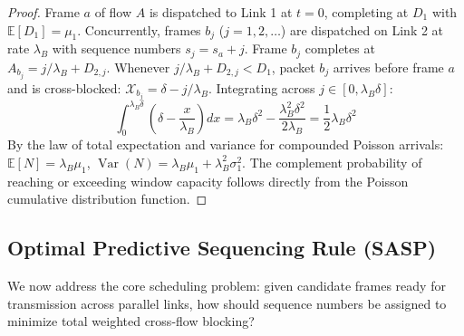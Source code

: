 \documentclass[10pt,journal,compsoc]{IEEEtran}
\begin{document}
\begin{proof}
Frame $a$ of flow $A$ is dispatched to Link 1 at $t=0$, completing at $D_1$ with $\mathbb{E}[D_1] = \mu_1$. Concurrently, frames $b_j$ ($j = 1, 2, \dots$) are dispatched on Link 2 at rate $\lambda_B$ with sequence numbers $s_j = s_a + j$. Frame $b_j$ completes at $A_{b_j} = j / \lambda_B + D_{2, j}$. Whenever $j / \lambda_B + D_{2, j} < D_1$, packet $b_j$ arrives before frame $a$ and is cross-blocked: $\mathcal{X}_{b_j} = \delta - j / \lambda_B$. Integrating across $j \in [0, \lambda_B \delta]$:
\begin{equation}
    \int_0^{\lambda_B \delta} \left(\delta - \frac{x}{\lambda_B}\right) dx = \lambda_B \delta^2 - \frac{\lambda_B^2 \delta^2}{2\lambda_B} = \frac{1}{2} \lambda_B \delta^2
\end{equation}
By the law of total expectation and variance for compounded Poisson arrivals: $\mathbb{E}[N] = \lambda_B \mu_1$, $\operatorname{Var}(N) = \lambda_B \mu_1 + \lambda_B^2 \sigma_1^2$. The complement probability of reaching or exceeding window capacity follows directly from the Poisson cumulative distribution function.
\end{proof}

\subsection{Optimal Predictive Sequencing Rule (SASP)}

We now address the core scheduling problem: given candidate frames ready for transmission across parallel links, how should sequence numbers be assigned to minimize total weighted cross-flow blocking?
\end{document}
